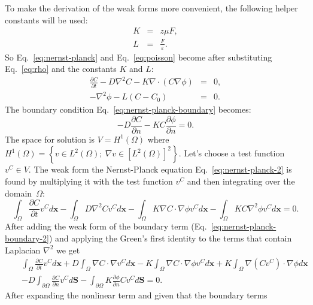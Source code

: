 To make the derivation of the weak forms more convenient, the following
helper constants will be used: 
\begin{eqnarray}
  K & = &z \mu F,\\
  L&=&\frac{F}{\varepsilon}.
  \label{eq:KL}
\end{eqnarray}
So Eq.~\eqref{eq:nernst-planck} and Eq.~\eqref{eq:poisson} become after 
substituting Eq.~\eqref{eq:rho} and the constants $K$ and $L$:
\begin{eqnarray}
  \frac{\partial C}{\partial t}-D\nabla^2 C-K\nabla\cdot \left(C\nabla\phi\right)&=&0,\label{eq:nernst-planck-2}\\
  -\nabla^2\phi-L\left(C-C_{0}\right)&=&0.\label{eq:poisson-2}
\end{eqnarray}
The boundary condition Eq.~\eqref{eq:nernst-planck-boundary} becomes:
\begin{equation}
  -D\frac{\partial C}{\partial n}-KC\frac{\partial\phi}{\partial n}=0.
  \label{eq:nernst-planck-boundary-2}
\end{equation}
The space for solution is $V=H^1\left(\Omega\right)$ where 
$H^1\left(\Omega\right)=\left\{v\in L^2\left(\Omega\right);\ \nabla v \in \left[L^2\left(\Omega\right)\right]^2\right\}$.
Let's choose a test function $v^C\in V$.
The weak form the Nernst-Planck equation Eq.~\eqref{eq:nernst-planck-2}
is found by multiplying it with the test function $v^C$ and then integrating over the domain~$\Omega$:
\begin{equation}
  \int_{\Omega}\frac{\partial C}{\partial t}v^C d\mathbf{x}
  -\int_{\Omega}D\nabla^2Cv^C d\mathbf{x}-\int_{\Omega}K\nabla C\cdot
  \nabla\phi v^C d\mathbf{x} - \int_{\Omega}KC\nabla^2\phi v^C d\mathbf{x}=0.
  \label{eq:nernst-planck-weak1}
\end{equation}
After adding the weak form of the boundary term 
(Eq.~\eqref{eq:nernst-planck-boundary-2}) and applying
the Green's first identity to the terms that contain Laplacian $\nabla^2$ we get
\begin{eqnarray}
 && \int_{\Omega}\frac{\partial C}{\partial t}v^C d\mathbf{x}+
  D\int_{\Omega}\nabla C\cdot\nabla v^C d\mathbf{x}-
  K\int_{\Omega}\nabla C \cdot \nabla \phi v^C d\mathbf{x}+
  K\int_{\Omega}\nabla\left(Cv^C\right)\cdot \nabla \phi d\mathbf{x}\\
  &&-D\int_{\partial\Omega}\frac{\partial C}{\partial n}v^C d\mathbf{S}-
  \int_{\partial\Omega}K\frac{\partial\phi}{\partial n}Cv^C d\mathbf{S}=0.
  \label{eq:nernst-planck-weak2}
\end{eqnarray}
After expanding the nonlinear term and given that the boundary terms
